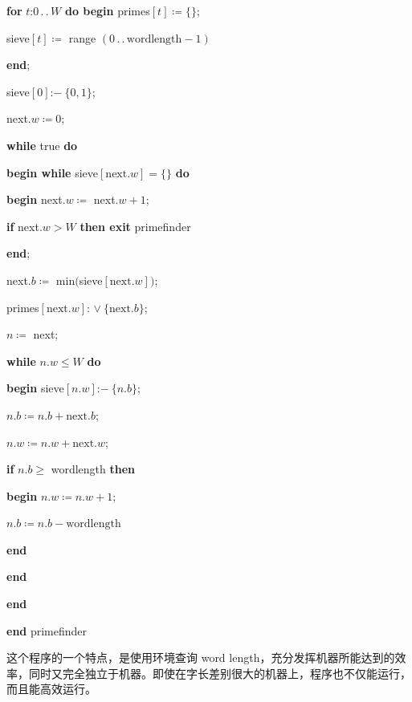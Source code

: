 \quad \quad \textbf{for} $t$:$0\,.\,.\,W$ \textbf{do begin} primes$[t] \coloneq \{\}$;

\quad \quad \quad sieve$[t] \coloneq$ range $(0\,.\,.\, \text{wordlength} - 1)$

\quad \quad \textbf{end};

\quad \quad sieve$[0]$:$-\ \{0, 1\}$;

\quad \quad next.$w\coloneq 0$;

\quad \quad \textbf{while} true \textbf{do}

\quad \quad \quad \textbf{begin while} sieve$[\text{next}.w] = \{\}$ \textbf{do}

\quad \quad \quad \quad \textbf{begin} next.$w\coloneq$ next.$w + 1$;

\quad \quad \quad \quad \quad \textbf{if} next.$w > W$ \textbf{then exit} primefinder

\quad \quad \quad \quad \textbf{end};

\quad \quad \quad \quad next.$b\coloneq$ min$($sieve$[\text{next}.w])$;

\quad \quad \quad \quad primes$[\text{next}.w]$: $\vee\ \{\text{next}.b\}$;

\quad \quad \quad \quad $n\coloneq$ next;

\quad \quad \quad \quad \textbf{while} $n.w \leqslant W$ \textbf{do}

\quad \quad \quad \quad \quad \textbf{begin} sieve$[n.w]$:$-\ \{n.b\}$;

\quad \quad \quad \quad \quad \quad $n.b\coloneq n.b + \text{next}.b$;

\quad \quad \quad \quad \quad \quad $n.w\coloneq n. w + \text{next}.w$;

\quad \quad \quad \quad \quad \quad \textbf{if} $n.b \geqslant$ wordlength \textbf{then}

\quad \quad \quad \quad \quad \quad \textbf{begin} $n.w\coloneq n.w + 1$;

\quad \quad \quad \quad \quad \quad \quad $n.b\coloneq n.b - \text{wordlength}$

\quad \quad \quad \quad \quad \quad \textbf{end}

\quad \quad \quad \quad \quad \textbf{end}

\quad \quad \quad \textbf{end}

\quad \textbf{end} primefinder

这个程序的一个特点，是使用环境查询 word length，充分发挥机器所能达到的效率，同时又完全独立于机器。即使在字长差别很大的机器上，程序也不仅能运行，而且能高效运行。

